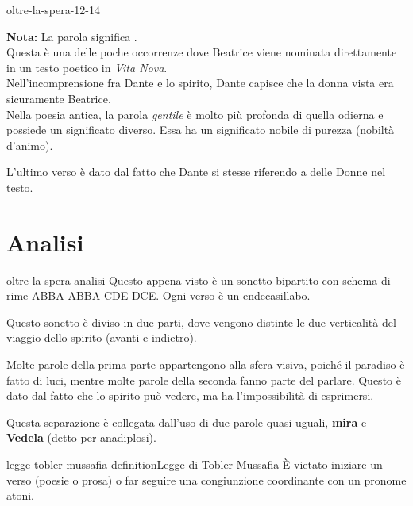 \documentclass[preview]{standalone}
\begin{document}
\begin{snippet}{oltre-la-spera-12-14}

    \textbf{\color{red}Nota:} La parola  significa . \\
    Questa è una delle poche occorrenze dove Beatrice viene nominata direttamente in un testo poetico in \textit{Vita Nova}.\\
    Nell'incomprensione fra Dante e lo spirito, Dante capisce che la donna vista era sicuramente
    Beatrice. \\
    Nella poesia antica, la parola \textit{gentile} è molto più profonda di quella odierna
    e possiede un significato diverso. Essa ha un significato nobile di purezza (nobiltà d'animo).
    
    L'ultimo verso è dato dal fatto che Dante si stesse riferendo a delle Donne nel testo.
\end{snippet}

\section{Analisi}

\begin{snippet}{oltre-la-spera-analisi}
    Questo appena visto è un sonetto bipartito con schema di rime ABBA ABBA CDE DCE. Ogni verso è un endecasillabo.

    Questo sonetto è diviso in due parti, dove vengono distinte le due verticalità del viaggio dello spirito
    (avanti e indietro).
    
    Molte parole della prima parte appartengono alla sfera visiva, poiché il paradiso
    è fatto di luci, mentre molte parole della seconda fanno parte del parlare.
    Questo è dato dal fatto che lo spirito può vedere, ma ha l'impossibilità di esprimersi.
    
    Questa separazione è collegata dall'uso di due parole quasi uguali,
    \textbf{mira} e \textbf{Vedela} (detto per anadiplosi).
\end{snippet}


\begin{snippetdefinition}{legge-tobler-mussafia-definition}{Legge di Tobler Mussafia}
    È vietato iniziare un verso (poesie o prosa) o far seguire una congiunzione coordinante
    con un pronome atoni.
\end{snippetdefinition}
\end{document}
